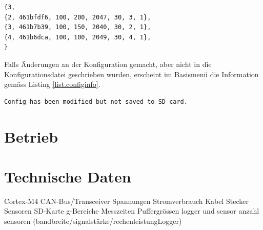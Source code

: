 \begin{lstlisting}[caption=Beispiel einer Konfigurationsdatei, label=list.configfile]
{3,
{2, 461bfdf6, 100, 200, 2047, 30, 3, 1},
{3, 461b7b39, 100, 150, 2040, 30, 2, 1},
{4, 461b6dca, 100, 100, 2049, 30, 4, 1},
}
\end{lstlisting}

Falls Änderungen an der Konfiguration gemacht, aber nicht in die Konfigurationsdatei geschrieben wurden, erscheint im Basismenü die Information gemäss Listing \ref{list.configinfo}.

\begin{lstlisting}[caption=Information bei ungespeicherter Konfiguration, label=list.configinfo]
Config has been modified but not saved to SD card.
\end{lstlisting}












\section{Betrieb}















\section{Technische Daten}
Cortex-M4
CAN-Bus/Transceiver
Spannungen
Stromverbrauch
Kabel
Stecker
Sensoren
SD-Karte
g-Bereiche
Messzeiten
Puffergrössen logger und sensor
anzahl sensoren (bandbreite/signalstärke/rechenleistungLogger)
